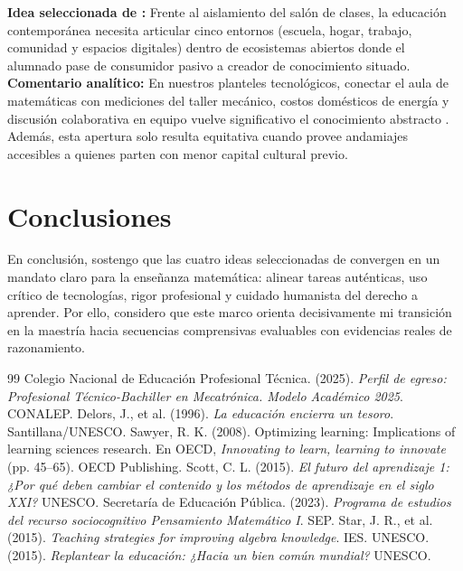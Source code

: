 \documentclass[spanish,letterpaper,oneside]{article}
\begin{document}
\begin{tcolorbox}[colback=iiiepePale,colframe=iiiepeBlue,title=\textbf{Idea 4 · Ecosistemas de aprendizaje interconectados y estudiante productor},breakable]
\textbf{Idea seleccionada de \citet{scott2015futuro}:} Frente al aislamiento del salón de clases, la educación contemporánea necesita articular cinco entornos (escuela, hogar, trabajo, comunidad y espacios digitales) dentro de ecosistemas abiertos donde el alumnado pase de consumidor pasivo a creador de conocimiento situado.\\[4pt]
\textbf{Comentario analítico:} En nuestros planteles tecnológicos, conectar el aula de matemáticas con mediciones del taller mecánico, costos domésticos de energía y discusión colaborativa en equipo vuelve significativo el conocimiento abstracto \citep{star2015algebra}. Además, esta apertura solo resulta equitativa cuando provee andamiajes accesibles a quienes parten con menor capital cultural previo.
\end{tcolorbox}

\clearpage
\section{Conclusiones}
En conclusión, sostengo que las cuatro ideas seleccionadas de \citet{scott2015futuro} convergen en un mandato claro para la enseñanza matemática: alinear tareas auténticas, uso crítico de tecnologías, rigor profesional y cuidado humanista del derecho a aprender. Por ello, considero que este marco orienta decisivamente mi transición en la maestría hacia secuencias comprensivas evaluables con evidencias reales de razonamiento.

\clearpage
\begin{thebibliography}{99}
 Colegio Nacional de Educación Profesional Técnica. (2025). \textit{Perfil de egreso: Profesional Técnico-Bachiller en Mecatrónica. Modelo Académico 2025}. CONALEP.
 Delors, J., et al. (1996). \textit{La educación encierra un tesoro}. Santillana/UNESCO.
 Sawyer, R. K. (2008). Optimizing learning: Implications of learning sciences research. En OECD, \textit{Innovating to learn, learning to innovate} (pp. 45--65). OECD Publishing.
 Scott, C. L. (2015). \textit{El futuro del aprendizaje 1: ¿Por qué deben cambiar el contenido y los métodos de aprendizaje en el siglo XXI?} UNESCO.
 Secretaría de Educación Pública. (2023). \textit{Programa de estudios del recurso sociocognitivo Pensamiento Matemático I}. SEP.
 Star, J. R., et al. (2015). \textit{Teaching strategies for improving algebra knowledge}. IES.
 UNESCO. (2015). \textit{Replantear la educación: ¿Hacia un bien común mundial?} UNESCO.
\end{thebibliography}
\end{document}
